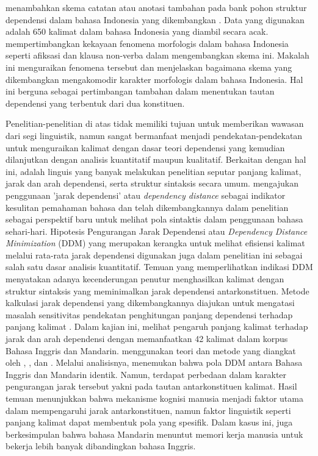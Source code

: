 \cite{irmawati2015dependency} menambahkan skema catatan atau anotasi tambahan pada bank pohon struktur dependensi dalam bahasa Indonesia yang dikembangkan \cite{green2012indonesian}. Data yang digunakan adalah 650 kalimat dalam bahasa Indonesia yang diambil secara acak. \cite{irmawati2015dependency} mempertimbangkan kekayaan fenomena morfologis dalam bahasa Indonesia seperti afiksasi dan klausa non-verba dalam mengembangkan skema ini. Makalah ini menguraikan fenomena tersebut dan menjelaskan bagaimana skema yang dikembangkan mengakomodir karakter morfologis dalam bahasa Indonesia. Hal ini berguna sebagai pertimbangan tambahan dalam menentukan tautan dependensi yang terbentuk dari dua konstituen. 

Penelitian-penelitian di atas tidak memiliki tujuan untuk memberikan wawasan dari segi linguistik, namun sangat bermanfaat menjadi pendekatan-pendekatan untuk menguraikan kalimat dengan dasar teori dependensi yang kemudian dilanjutkan dengan analisis kuantitatif maupun kualitatif. Berkaitan dengan hal ini, \cite{liu2008dependency} adalah linguis yang banyak melakukan penelitian seputar panjang kalimat, jarak dan arah dependensi, serta struktur sintaksis secara umum. \cite{liu2008dependency} mengajukan penggunaan 'jarak dependensi' atau \textit{dependency distance} sebagai indikator kesulitan pemahaman bahasa dan telah dikembangkannya dalam penelitian \cite{liu2017dependency} sebagai perspektif baru untuk melihat pola sintaktis dalam penggunaan bahasa sehari-hari. Hipotesis Pengurangan Jarak Dependensi atau \textit{Dependency Distance Minimization} (DDM) yang merupakan kerangka untuk melihat efisiensi kalimat melalui rata-rata jarak dependensi digunakan juga dalam penelitian ini sebagai salah satu dasar analisis kuantitatif. Temuan yang memperlihatkan indikasi DDM menyatakan adanya kecenderungan penutur menghasilkan kalimat dengan struktur sintaksis yang meminimalkan jarak dependensi antarkonstituen. Metode kalkulasi jarak dependensi yang dikembangkannya diajukan untuk mengatasi masalah sensitivitas pendekatan penghitungan panjang dependensi terhadap panjang kalimat \citep{jiang2015effects}. Dalam kajian ini, \cite{jiang2015effects} melihat pengaruh panjang kalimat terhadap jarak dan arah dependensi dengan memanfaatkan 42 kalimat dalam korpus Bahasa Inggris dan Mandarin. \cite{jiang2015effects} menggunakan teori dan metode yang diangkat oleh \cite{tesniere1959elements}, \cite{hudson2007language}, dan \cite{nivre2006maltparser}. Melalui analisisnya, \cite{jiang2015effects} menemukan bahwa pola DDM antara Bahasa Inggris dan Mandarin identik. Namun, terdapat perbedaan dalam karakter pengurangan jarak tersebut yakni pada tautan antarkonstituen kalimat. Hasil temuan menunjukkan bahwa mekanisme kognisi manusia menjadi faktor utama dalam mempengaruhi jarak antarkonstituen, namun faktor linguistik seperti panjang kalimat dapat membentuk pola yang spesifik. Dalam kasus ini, \cite{jiang2015effects} juga berkesimpulan bahwa bahasa Mandarin menuntut memori kerja manusia untuk bekerja lebih banyak dibandingkan bahasa Inggris. 

